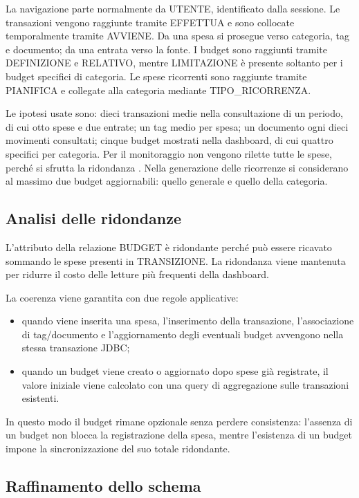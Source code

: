 \documentclass[11pt,a4paper]{article}
\begin{document}
La navigazione parte normalmente da \textsc{UTENTE}, identificato dalla sessione. Le transazioni vengono raggiunte tramite \textsc{EFFETTUA} e sono collocate temporalmente tramite \textsc{AVVIENE}. Da una spesa si prosegue verso categoria, tag e documento; da una entrata verso la fonte. I budget sono raggiunti tramite \textsc{DEFINIZIONE} e \textsc{RELATIVO}, mentre \textsc{LIMITAZIONE} è presente soltanto per i budget specifici di categoria. Le spese ricorrenti sono raggiunte tramite \textsc{PIANIFICA} e collegate alla categoria mediante \textsc{TIPO\_RICORRENZA}.

Le ipotesi usate sono: dieci transazioni medie nella consultazione di un periodo, di cui otto spese e due entrate; un tag medio per spesa; un documento ogni dieci movimenti consultati; cinque budget mostrati nella dashboard, di cui quattro specifici per categoria. Per il monitoraggio non vengono rilette tutte le spese, perché si sfrutta la ridondanza . Nella generazione delle ricorrenze si considerano al massimo due budget aggiornabili: quello generale e quello della categoria.

\subsection{Analisi delle ridondanze}
L'attributo  della relazione \textsc{BUDGET} è ridondante perché può essere ricavato sommando le spese presenti in \textsc{TRANSIZIONE}. La ridondanza viene mantenuta per ridurre il costo delle letture più frequenti della dashboard.

La coerenza viene garantita con due regole applicative:
\begin{itemize}
    \item quando viene inserita una spesa, l'inserimento della transazione, l'associazione di tag/documento e l'aggiornamento degli eventuali budget avvengono nella stessa transazione JDBC;
    \item quando un budget viene creato o aggiornato dopo spese già registrate, il valore iniziale viene calcolato con una query di aggregazione sulle transazioni esistenti.
\end{itemize}

In questo modo il budget rimane opzionale senza perdere consistenza: l'assenza di un budget non blocca la registrazione della spesa, mentre l'esistenza di un budget impone la sincronizzazione del suo totale ridondante.

\subsection{Raffinamento dello schema}
\end{document}
